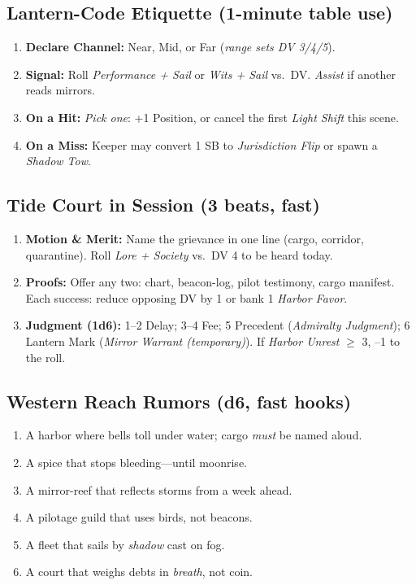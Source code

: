 \subsection*{Lantern-Code Etiquette (1-minute table use)}
\begin{enumerate}
  \item \textbf{Declare Channel:} Near, Mid, or Far (\emph{range sets DV 3/4/5}).
  \item \textbf{Signal:} Roll \emph{Performance + Sail} or \emph{Wits + Sail} vs.\ DV. \emph{Assist} if another reads mirrors.
  \item \textbf{On a Hit:} \emph{Pick one}: +1 Position, or cancel the first \emph{Light Shift} this scene.
  \item \textbf{On a Miss:} Keeper may convert 1 SB to \emph{Jurisdiction Flip} or spawn a \emph{Shadow Tow}.
\end{enumerate}

\subsection*{Tide Court in Session (3 beats, fast)}
\begin{enumerate}
  \item \textbf{Motion \& Merit:} Name the grievance in one line (cargo, corridor, quarantine). Roll \emph{Lore + Society} vs.\ DV 4 to be heard today.
  \item \textbf{Proofs:} Offer any two: chart, beacon-log, pilot testimony, cargo manifest. Each success: reduce opposing DV by 1 or bank 1 \emph{Harbor Favor}.
  \item \textbf{Judgment (1d6):} 1–2 Delay; 3–4 Fee; 5 Precedent (\emph{Admiralty Judgment}); 6 Lantern Mark (\emph{Mirror Warrant (temporary)}). If \emph{Harbor Unrest} $\geq$ 3, --1 to the roll.
\end{enumerate}

\subsection*{Western Reach Rumors (d6, fast hooks)}
\begin{enumerate}
  \item A harbor where bells toll under water; cargo \emph{must} be named aloud.
  \item A spice that stops bleeding—until moonrise.
  \item A mirror-reef that reflects storms from a week ahead.
  \item A pilotage guild that uses birds, not beacons.
  \item A fleet that sails by \emph{shadow} cast on fog.
  \item A court that weighs debts in \emph{breath}, not coin.
\end{enumerate}

